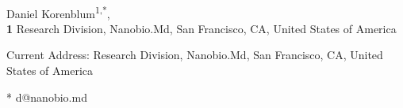\documentclass[10pt,letterpaper]{article}
\date{}
\begin{document}
\vspace*{0.2in}

\begin{flushleft}
{\Large
\textbf{} %
}
\newline
\\
Daniel Korenblum\textsuperscript{1,*},
\\
\bigskip
\textbf{1} Research Division, Nanobio.Md, San Francisco, CA, United States of America
\bigskip

%
%


\textcurrency Current Address: Research Division, Nanobio.Md, San Francisco, CA, United States of America %



* d@nanobio.md

\end{flushleft}
\end{document}
